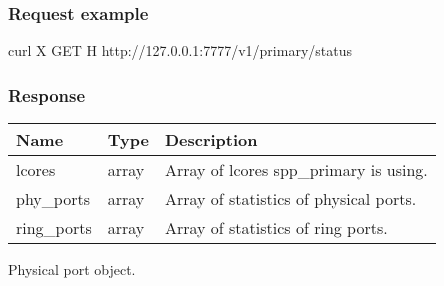 \documentclass[a4paper,11pt,openany,oneside,english]{sphinxmanual}
\begin{document}
\subsubsection{Request example}
\label{\detokenize{api_ref/spp_primary:request-example}}
\begin{sphinxVerbatim}[commandchars=\\\{\},formatcom=\footnotesize]
 curl \PYGZhy{}X GET \PYGZhy{}H  
  http://127.0.0.1:7777/v1/primary/status
\end{sphinxVerbatim}


\subsubsection{Response}
\label{\detokenize{api_ref/spp_primary:response}}

\begin{savenotes}\sphinxattablestart
\centering
{}
\sphinxthecaptionisattop
{}\label{\detokenize{api_ref/spp_primary:id21}}\label{\detokenize{api_ref/spp_primary:table-spp-ctl-primary-status}}
\sphinxaftertopcaption
\begin{tabulary}{\linewidth}[t]{|T|T|T|}
\hline
\sphinxstyletheadfamily 
Name
&\sphinxstyletheadfamily 
Type
&\sphinxstyletheadfamily 
Description
\\
\hline
lcores
&
array
&
Array of lcores spp\_primary is using.
\\
\hline
phy\_ports
&
array
&
Array of statistics of physical ports.
\\
\hline
ring\_ports
&
array
&
Array of statistics of ring ports.
\\
\hline
\end{tabulary}
\par
\sphinxattableend\end{savenotes}

Physical port object.
\end{document}
